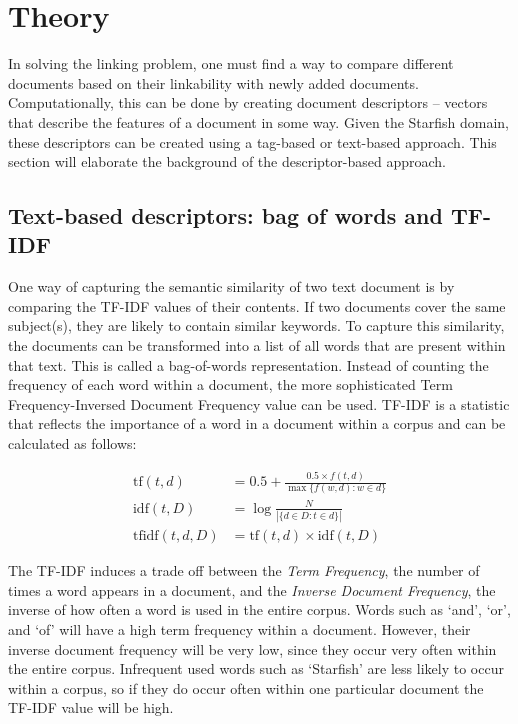 \section{Theory}

In solving the linking problem, one must find a way to compare different
documents based on their linkability with newly added documents.
Computationally, this can be done by creating document descriptors -- vectors
that describe the features of a document in some way. Given the Starfish
domain, these descriptors can be created using a tag-based or text-based approach. This section will elaborate the background of the descriptor-based approach. 

\subsection{Text-based descriptors: bag of words and TF-IDF}
One way of capturing the semantic similarity of two text document is by
comparing the TF-IDF values of their contents. If two documents cover the same
subject(s), they are likely to contain similar keywords. To capture this
similarity, the documents can be transformed into a list of all words that are
present within that text. This is called a bag-of-words representation. Instead
of counting the frequency of each word within a document, the more
sophisticated Term Frequency-Inversed Document Frequency value can be used.
TF-IDF is a statistic that reflects the importance of a word in a document
within a corpus and can be calculated as follows:

\begin{align}
  \textrm{tf}(t,d)      &= 0.5 + \frac{0.5 \times {f}(t, d)}{\max\{{f}(w, d):w \in d\}}\\
  \textrm{idf}(t, D)    &=  \log \frac{N}{|\{d \in D: t \in d\}|}\\
  \textrm{tfidf}(t,d,D) &= \textrm{tf}(t,d) \times \textrm{idf}(t, D)
\end{align}

The TF-IDF induces a trade off between the \emph{Term Frequency}, the number of times
a word appears in a document, and the \emph{Inverse Document Frequency}, the inverse
of how often a word is used in the entire corpus. Words such as `and', `or',
and `of' will have a high term frequency within a document. However, their
inverse document frequency will be very low, since they occur very often within
the entire corpus. Infrequent used words such as `Starfish' are less likely to
occur within a corpus, so if they do occur often within one particular document
the TF-IDF value will be high. 

